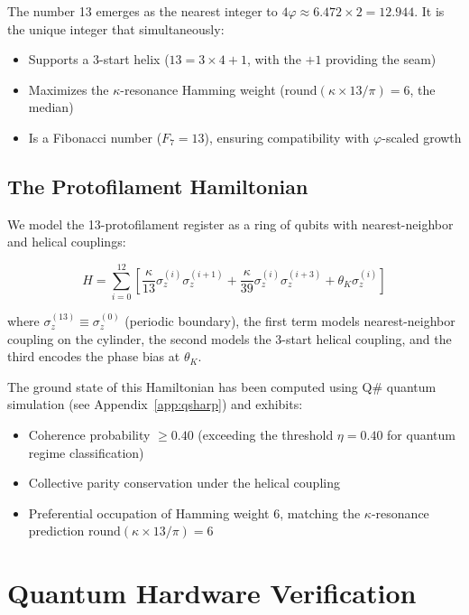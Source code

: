 \documentclass[12pt,a4paper]{article}
\theoremstyle{plain}
\theoremstyle{definition}
\newcommand{\thetaK}{\theta_K}
\newcommand{\golden}{\varphi}
\newcommand{\kap}{\kappa}
\begin{document}
The number 13 emerges as the nearest integer to $4\golden \approx 6.472 \times 2 = 12.944$. It is the unique integer that simultaneously:
\begin{itemize}
    \item Supports a 3-start helix ($13 = 3 \times 4 + 1$, with the $+1$ providing the seam)
    \item Maximizes the $\kap$-resonance Hamming weight ($\mathrm{round}(\kap \times 13/\pi) = 6$, the median)
    \item Is a Fibonacci number ($F_7 = 13$), ensuring compatibility with $\golden$-scaled growth
\end{itemize}

\subsection{The Protofilament Hamiltonian}

We model the 13-protofilament register as a ring of qubits with nearest-neighbor and helical couplings:

\begin{equation}
\label{eq:hamiltonian}
H = \sum_{i=0}^{12} \left[ \frac{\kap}{13} \sigma_z^{(i)} \sigma_z^{(i+1)} + \frac{\kap}{39} \sigma_z^{(i)} \sigma_z^{(i+3)} + \thetaK \sigma_z^{(i)} \right]
\end{equation}

\noindent where $\sigma_z^{(13)} \equiv \sigma_z^{(0)}$ (periodic boundary), the first term models nearest-neighbor coupling on the cylinder, the second models the 3-start helical coupling, and the third encodes the phase bias at $\thetaK$.

The ground state of this Hamiltonian has been computed using Q\# quantum simulation (see Appendix~\ref{app:qsharp}) and exhibits:
\begin{itemize}
    \item Coherence probability $\geq 0.40$ (exceeding the threshold $\eta = 0.40$ for quantum regime classification)
    \item Collective parity conservation under the helical coupling
    \item Preferential occupation of Hamming weight 6, matching the $\kap$-resonance prediction $\mathrm{round}(\kap \times 13/\pi) = 6$
\end{itemize}

\section{Quantum Hardware Verification}
\label{sec:hardware}
\end{document}

